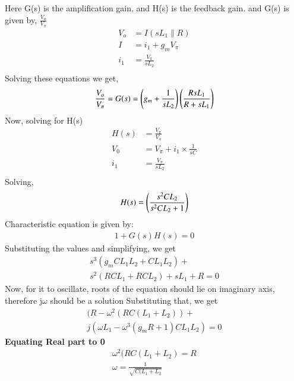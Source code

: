 \begin{enumerate}[label=\arabic*.,ref=\theenumi]
Here G(s) is the amplification gain, and H(s) is the feedback gain.\newline
and G(s) is given by, $\frac{V_o}{V_\pi}$
\begin{align}
    V_o &= I(sL_1\parallel R)\\
    I &= i_1 + g_mV_\pi\\
    i_1 &= \frac{V_\pi}{sL_2}\\
\end{align}
Solving these equations we get,\newline
\begin{align}
    \frac{V_o}{V_\pi} = G(s) = \left(g_m + \frac{1}{sL_2}\right)\left(\frac{RsL_1}{R + sL_1}\right)
\end{align}
Now, solving for H(s)\newline
\begin{align}
H(s) &= \frac{V_\pi}{V_o}\\
V_0 &= V_\pi + i_1\times \frac{1}{sC}\\
i_1 &= \frac{V_\pi}{sL_2}\\
\end{align}
Solving,\newline
\begin{align}
    H(s) = \left(\frac{s^2CL_2}{s^2CL_2 +1}\right)
\end{align}
Characteristic equation is given by:\newline
\begin{align}
    1+G(s)H(s) = 0
\end{align}
Substituting the values and simplifying, we get\newline
\begin{multline}
    s^3(g_mCL_1L_2 + CL_1L_2) +\\ s^2(RCL_1 + RCL_2) + sL_1 + R =0
\end{multline}
Now, for it to oscillate, roots of the equation should lie on imaginary axis, therefore j$\omega$ should be a solution\newline
Substituting that, we get
\begin{multline}
    (R - \omega^2(RC(L_1 +L_2)) +\\ j(\omega L_1 - \omega^3(g_mR +1)CL_1L_2) = 0
\end{multline}
\textbf{Equating Real part to 0}\newline
\begin{align}
    \omega^2(RC(L_1 +L_2) = R\\
    \omega = \frac{1}{\sqrt{C(L_1 + L_2}}
\end{align}

\end{enumerate}
